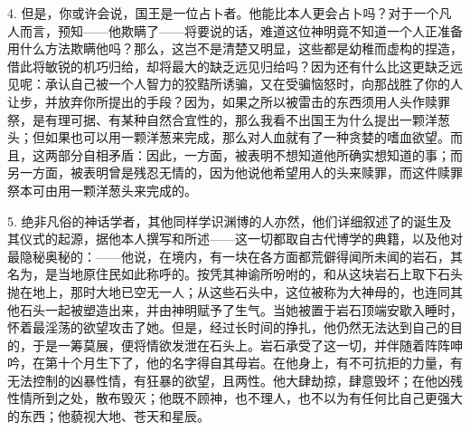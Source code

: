 4. 但是，你或许会说，国王是一位占卜者。他能比本人更会占卜吗？对于一个凡人而言，预知——他欺瞒了——将要说的话，难道这位神明竟不知道一个人正准备用什么方法欺瞒他吗？那么，这岂不是清楚又明显，这些都是幼稚而虚构的捏造，借此将敏锐的机巧归给，却将最大的缺乏远见归给吗？因为还有什么比这更缺乏远见呢：承认自己被一个人智力的狡黠所诱骗，又在受骗恼怒时，向那战胜了你的人让步，并放弃你所提出的手段？因为，如果之所以被雷击的东西须用人头作赎罪祭，是有理可据、有某种自然合宜性的，那么我看不出国王为什么提出一颗洋葱头；但如果也可以用一颗洋葱来完成，那么对人血就有了一种贪婪的嗜血欲望。而且，这两部分自相矛盾：因此，一方面，被表明不想知道他所确实想知道的事；而另一方面，被表明曾是残忍无情的，因为他说他希望用人的头来赎罪，而这件赎罪祭本可由用一颗洋葱头来完成的。\par

5. 绝非凡俗的神话学者，其他同样学识渊博的人亦然，他们详细叙述了的诞生及其仪式的起源，据他本人撰写和所述——这一切都取自古代博学的典籍，以及他对最隐秘奥秘的：——他说，在境内，有一块在各方面都荒僻得闻所未闻的岩石，其名为，是当地原住民如此称呼的。按凭其神谕所吩咐的，和从这块岩石上取下石头抛在地上，那时大地已空无一人；从这些石头中，这位被称为大神母的，也连同其他石头一起被塑造出来，并由神明赋予了生气。当她被置于岩石顶端安歇入睡时，怀着最淫荡的欲望攻击了她。但是，经过长时间的挣扎，他仍然无法达到自己的目的，于是一筹莫展，便将情欲发泄在石头上。岩石承受了这一切，并伴随着阵阵呻吟，在第十个月生下了，他的名字得自其母岩。在他身上，有不可抗拒的力量，有无法控制的凶暴性情，有狂暴的欲望，且两性。他大肆劫掠，肆意毁坏；在他凶残性情所到之处，散布毁灭；他既不顾神，也不理人，也不以为有任何比自己更强大的东西；他藐视大地、苍天和星辰。\par

